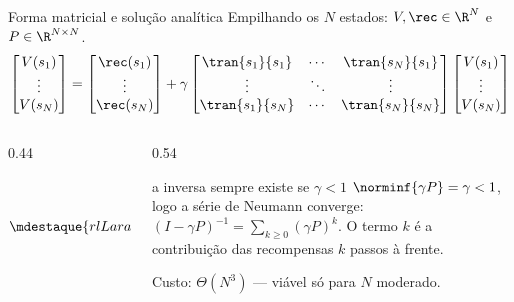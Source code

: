 \documentclass[aspectratio=169, 11pt]{beamer}
\begin{document}
\begin{frame}{Forma matricial e solução analítica}
  Empilhando os $N$ estados: $V, \rec \in \R^N$ e $P \in \R^{N \times N}$.
  \vspace{-0.2em}
  \[
    \begin{bmatrix} V(s_1) \\ \vdots \\ V(s_N) \end{bmatrix}
    =
    \begin{bmatrix} \rec(s_1) \\ \vdots \\ \rec(s_N) \end{bmatrix}
    + \gamma
    \begin{bmatrix}
      \tran{s_1}{s_1} & \cdots & \tran{s_N}{s_1} \\
      \vdots & \ddots & \vdots \\
      \tran{s_1}{s_N} & \cdots & \tran{s_N}{s_N}
    \end{bmatrix}
    \begin{bmatrix} V(s_1) \\ \vdots \\ V(s_N) \end{bmatrix}
  \]
  \vspace{-0.6em}
  \begin{columns}[c]
    \begin{column}{0.44\textwidth}
      \[
        \begin{aligned}
          V &= \rec + \gamma P V \\
          (I - \gamma P)\, V &= \rec \\[0.3em]
          \mdestaque{rlLaranja}{V = (I - \gamma P)^{-1} \rec}
        \end{aligned}
      \]
    \end{column}
    \begin{column}{0.54\textwidth}
      \begin{teobox}{a inversa sempre existe se $\gamma<1$}
        $\norminf{\gamma P} = \gamma < 1$, logo a série de Neumann converge:
        $(I-\gamma P)^{-1} = \sum_{k \ge 0} (\gamma P)^k$.
        O termo $k$ é a contribuição das recompensas $k$ passos à frente.
      \end{teobox}
      {\small Custo: $\Theta(N^3)$ --- viável só para $N$ moderado.}
    \end{column}
  \end{columns}
\end{frame}
\end{document}
